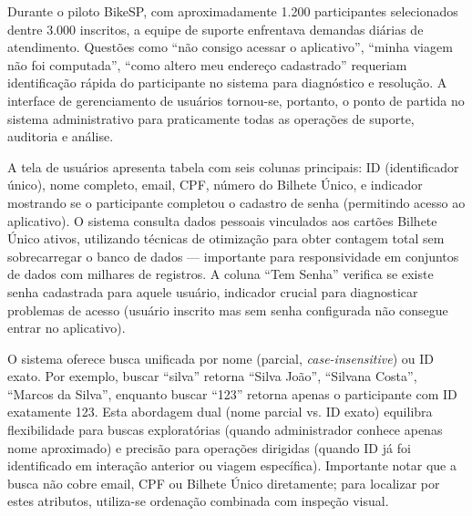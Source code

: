 

Durante o piloto BikeSP, com
aproximadamente 1.200 participantes selecionados dentre 3.000 inscritos, a equipe de
suporte enfrentava demandas diárias de atendimento. Questões como ``não consigo acessar o aplicativo'', ``minha viagem não foi
computada'', ``como altero meu endereço cadastrado'' requeriam identificação rápida
do participante no sistema para diagnóstico e resolução. A interface de gerenciamento
de usuários tornou-se, portanto, o
ponto de partida no sistema administrativo  para praticamente todas as operações de suporte,
auditoria e análise.

A tela de usuários apresenta
tabela com seis colunas principais: ID (identificador único), nome
completo, email, CPF, número do Bilhete Único, e indicador mostrando se o participante
completou o cadastro de senha (permitindo acesso ao aplicativo). O sistema consulta dados pessoais vinculados aos cartões Bilhete Único ativos, utilizando técnicas de otimização para obter contagem total sem sobrecarregar o banco de dados --- importante para responsividade em conjuntos de dados com milhares de registros. A coluna ``Tem Senha'' verifica se existe senha cadastrada para aquele usuário, indicador crucial para diagnosticar
problemas de acesso (usuário inscrito mas sem senha configurada não consegue entrar no aplicativo).

O sistema oferece busca unificada por nome
(parcial, \textit{case-insensitive}\@) ou ID exato.
Por exemplo, buscar ``silva'' retorna ``Silva João'', ``Silvana Costa'', ``Marcos da
Silva'', enquanto buscar ``123'' retorna apenas o participante com ID exatamente 123.
Esta abordagem dual (nome parcial vs. ID exato) equilibra flexibilidade para buscas
exploratórias (quando administrador conhece apenas nome aproximado) e precisão para
operações dirigidas (quando ID já foi identificado em interação anterior ou viagem
específica). Importante notar que a busca não cobre email, CPF ou Bilhete
Único diretamente; para localizar por estes atributos, utiliza-se ordenação combinada com inspeção visual.


